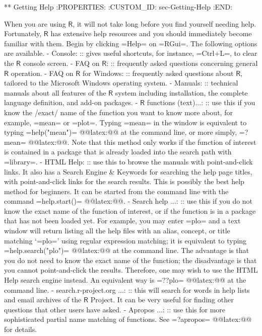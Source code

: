 ** Getting Help
:PROPERTIES:
:CUSTOM_ID: sec-Getting-Help
:END:

When you are using \(\mathsf{R}\), it will not take long before you
find yourself needing help. Fortunately, \(\mathsf{R}\) has extensive
help resources and you should immediately become familiar with
them. Begin by clicking =Help= on =RGui=. The following options are
available.
- Console: :: gives useful shortcuts, for instance, =Ctrl+L=, to clear
              the \(\mathsf{R}\) console screen.
- FAQ on \(\mathsf{R}\): :: frequently asked questions concerning
     general \(\mathsf{R}\) operation.
- FAQ on \(\mathsf{R}\) for Windows: :: frequently asked questions
     about \(\mathsf{R}\), tailored to the Microsoft Windows operating
     system.
- Manuals: :: technical manuals about all features of the
              \(\mathsf{R}\) system including installation, the
              complete language definition, and add-on packages.
- \(\mathsf{R}\) functions (text)...: :: use this if you know the
     /exact/ name of the function you want to know more about, for
     example, =mean= or =plot=. Typing =mean= in the window is
     equivalent to typing =help("mean")=
     @@latex:@@ at the command line, or more
     simply, =?mean= @@latex:@@. Note that this
     method only works if the function of interest is contained in a
     package that is already loaded into the search path with
     =library=.
- HTML Help: :: use this to browse the manuals with point-and-click
                links. It also has a Search Engine \& Keywords for
                searching the help page titles, with point-and-click
                links for the search results. This is possibly the
                best help method for beginners. It can be started from
                the command line with the command
                =help.start()= @@latex:@@.
- Search help ...: :: use this if you do not know the exact name of
     the function of interest, or if the function is in a package that
     has not been loaded yet. For example, you may enter =plo= and a
     text window will return listing all the help files with an alias,
     concept, or title matching `=plo=' using regular expression
     matching; it is equivalent to typing
     =help.search("plo")= @@latex:@@ at
     the command line. The advantage is that you do not need to know
     the exact name of the function; the disadvantage is that you
     cannot point-and-click the results. Therefore, one may wish to
     use the HTML Help search engine instead. An equivalent way is
     =??plo= @@latex:@@ at the command line.
- search.r-project.org ...: :: this will search for words in help
     lists and email archives of the \(\mathsf{R}\) Project. It can be
     very useful for finding other questions that other users have
     asked.
- Apropos ...: :: use this for more sophisticated partial name
                  matching of functions. See =?apropos=
                  @@latex:@@ for details.

